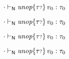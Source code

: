 {\begin{lamportproof*}
    \begin{pfproof}
      \absurdstep
        \begin{pfproof}
          ${\cdot} \vdash_{\mathsf{N}} \textit{unop}{\{{\tau{\scriptstyle ?}}\}}\,v_0 : \tau_0$
        \end{pfproof}
    \end{pfproof}

    \begin{pfproof}
      \absurdstep
        \begin{pfproof}
          ${\cdot} \vdash_{\mathsf{N}} \textit{unop}{\{{\tau{\scriptstyle ?}}\}}\,v_0 : \tau_0$
        \end{pfproof}
    \end{pfproof}

    \begin{pfproof}
      \absurdstep
        \begin{pfproof}
          ${\cdot} \vdash_{\mathsf{N}} \textit{unop}{\{{\tau{\scriptstyle ?}}\}}\,v_0 : \tau_0$
        \end{pfproof}
    \end{pfproof}

    \begin{pfproof}
      \absurdstep
        \begin{pfproof}
          ${\cdot} \vdash_{\mathsf{N}} \textit{unop}{\{{\tau{\scriptstyle ?}}\}}\,v_0 : \tau_0$
        \end{pfproof}
    \end{pfproof}

\end{lamportproof*}}


